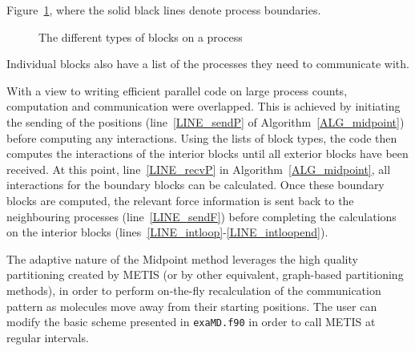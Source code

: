 \documentclass[paper=a4, fontsize=11pt,bibtotoc]{scrartcl}		%
\newcommand{\TT}[1]{\texttt{#1}}
\begin{document}
Figure~\ref{FIG_blocklists}, where the solid black lines denote process boundaries.
\begin{figure}
	\centering
	\caption{The different types of blocks on a process}
	\label{FIG_blocklists}
\end{figure}
Individual blocks also have a list of the processes they need to communicate with.

With a view to writing efficient parallel code on large process counts, computation and communication were overlapped. This is achieved 
by initiating the sending of the positions (line~\ref{LINE_sendP} of Algorithm~\ref{ALG_midpoint}) before computing any interactions.  
Using the lists of block types, the code then computes the interactions of the interior blocks until all exterior blocks have been received. 
At this point, line~\ref{LINE_recvP} in Algorithm~\ref{ALG_midpoint}, all interactions for the boundary blocks can be calculated. 
Once these boundary blocks are computed, the relevant force information is sent back to the neighbouring processes (line~\ref{LINE_sendF}) before 
completing the calculations on the interior blocks (lines~\ref{LINE_intloop}-\ref{LINE_intloopend}).

The adaptive nature of the Midpoint method leverages the high quality partitioning created by METIS (or by other equivalent, graph-based
partitioning methods), in order to perform on-the-fly recalculation of the communication pattern as molecules move away from their starting positions. 
The user can modify the basic scheme presented in \TT{exaMD.f90} in order to call METIS at regular intervals.
\end{document}
